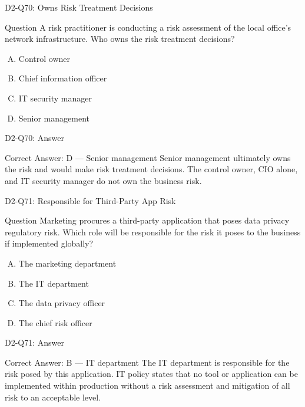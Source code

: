 \documentclass{beamer}
\begin{document}
	\begin{frame}{D2-Q70: Owns Risk Treatment Decisions}
		\begin{block}{Question}
			A risk practitioner is conducting a risk assessment of the local office's network infrastructure. Who owns the risk treatment decisions?
		\end{block}
		\begin{enumerate}[(A)]
			\item Control owner
			\item Chief information officer
			\item IT security manager
			\item Senior management
		\end{enumerate}
	\end{frame}
	\begin{frame}{D2-Q70: Answer}
		\begin{block}{Correct Answer: D --- Senior management}
			Senior management ultimately owns the risk and would make risk treatment decisions. The control owner, CIO alone, and IT security manager do not own the business risk.
		\end{block}
	\end{frame}
	
	\begin{frame}{D2-Q71: Responsible for Third-Party App Risk}
		\begin{block}{Question}
			Marketing procures a third-party application that poses data privacy regulatory risk. Which role will be responsible for the risk it poses to the business if implemented globally?
		\end{block}
		\begin{enumerate}[(A)]
			\item The marketing department
			\item The IT department
			\item The data privacy officer
			\item The chief risk officer
		\end{enumerate}
	\end{frame}
	\begin{frame}{D2-Q71: Answer}
		\begin{block}{Correct Answer: B --- IT department}
			The IT department is responsible for the risk posed by this application. IT policy states that no tool or application can be implemented within production without a risk assessment and mitigation of all risk to an acceptable level.
		\end{block}
	\end{frame}
	
\end{document}
